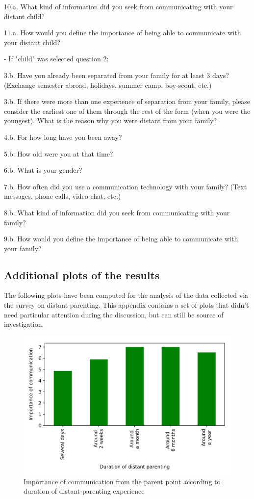10.a. What kind of information did you seek from communicating with your distant child?

11.a. How would you define the importance of being able to communicate with your distant child?

\vspace{4pt}
\noindent - If "child" was selected question 2: 

3.b. Have you already been separated from your family for at least 3 days? (Exchange semester abroad, holidays, summer camp, boy-scout, etc.)

3.b. If there were more than one experience of separation from your family, please consider the earliest one of them through the rest of the form (when you were the youngest). What is the reason why you were distant from your family? 

4.b. For how long have you been away?

5.b. How old were you at that time?

6.b. What is your gender?

7.b. How often did you use a communication technology with your family? (Text messages, phone calls, video chat, etc.)

8.b. What kind of information did you seek from communicating with your family?

9.b. How would you define the importance of being able to communicate with your family?


\subsection{Additional plots of the results}
\label{appendix:additional-plots}

The following plots have been computed for the analysis of the data collected via the survey on distant-parenting. This appendix contains a set of plots that didn't need particular attention during the discussion, but can still be source of investigation.

\begin{figure}[h!]
    \centering
    \includegraphics[scale=0.58]{plots/plot_5.png}
    \caption{Importance of communication from the parent point according to duration of distant-parenting experience}
    \label{fig:plot_5}
\end{figure}

